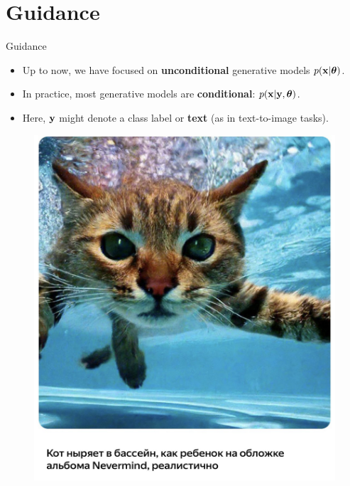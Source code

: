 \documentclass{beamer}
\begin{document}
\section{Guidance}
\begin{frame}{Guidance}
	\begin{itemize}
	\item Up to now, we have focused on \textbf{unconditional} generative models $p(\mathbf{x} | \boldsymbol{\theta})$.
	\item In practice, most generative models are \textbf{conditional}: $p(\mathbf{x} | \mathbf{y}, \boldsymbol{\theta})$.
	\item Here, $\mathbf{y}$ might denote a class label or \textbf{text} (as in text-to-image tasks).
	\end{itemize}
	\vspace{-0.3cm}
	\begin{minipage}[t]{0.5\columnwidth}
		\begin{figure}
			\includegraphics[width=0.9\linewidth]{figs/shedevrum1}
		\end{figure}
	\end{minipage}%
	\begin{minipage}[t]{0.5\columnwidth}
		\begin{figure}

\end{figure}
\end{minipage}
\end{frame}
\end{document}
